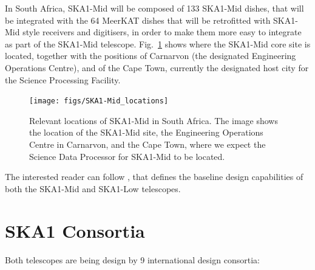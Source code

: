 \documentclass[a4paper,
               biblatex,       %
               keeplastbox,    %
               ]{jacow-2_1}    %
\begin{document}
In South Africa, SKA1-Mid will be composed of 133 SKA1-Mid dishes, that will be integrated with the 64 MeerKAT dishes that will be retrofitted with SKA1-Mid style receivers and digitisers, in order to make them more easy to integrate as part of the SKA1-Mid telescope.
Fig.~\ref{fig:figs_SKA1-Mid_locations} shows where the SKA1-Mid core site is located, together with the positions of Carnarvon (the designated Engineering Operations Centre), and of the Cape Town, currently the designated host city for the Science Processing Facility.

\begin{figure}[!htb]
  \centering
    \texttt{[image: figs/SKA1-Mid\_locations]}
  \caption{Relevant locations of SKA1-Mid in South Africa. The image shows the location of the SKA1-Mid site,  the Engineering Operations Centre in Carnarvon, and the Cape Town, where we expect the Science Data Processor for SKA1-Mid to be located.}
  \label{fig:figs_SKA1-Mid_locations}
\end{figure}

The interested reader can follow \cite{SKA-TEL-SKO-0000002_03}, that defines the baseline design capabilities of both the SKA1-Mid and SKA1-Low telescopes.



\section{SKA1 Consortia} %
\label{sec:ska1_consortia}
Both telescopes are being design by 9 international design consortia:
\end{document}
